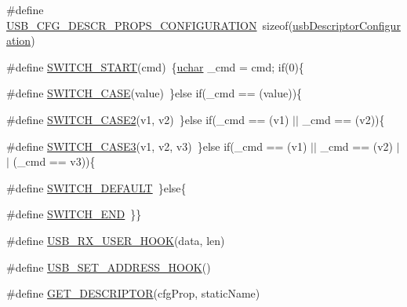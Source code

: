 \begin{DoxyCompactItemize}
\item 
\#define \hyperlink{mhvlib-_vusb-_console_2vusb_2usbdrv_8c_a8aae9f682ca9f91faae0453e4351a50b}{U\-S\-B\-\_\-\-C\-F\-G\-\_\-\-D\-E\-S\-C\-R\-\_\-\-P\-R\-O\-P\-S\-\_\-\-C\-O\-N\-F\-I\-G\-U\-R\-A\-T\-I\-O\-N}~sizeof(\hyperlink{mhvlib-_vusb-_console_2vusb_2usbdrv_8h_a9a566690103d3a34df4893e7c0d3bf10}{usb\-Descriptor\-Configuration})
\item 
\#define \hyperlink{mhvlib-_vusb-_console_2vusb_2usbdrv_8c_ac56b9d981e3fec2bbfb3f15788f6bdb2}{S\-W\-I\-T\-C\-H\-\_\-\-S\-T\-A\-R\-T}(cmd)~\{\hyperlink{mhvlib-_vusb-_console_2vusb_2usbdrv_8h_aa8ddf20cdd716b652e76e23e5e700893}{uchar} \-\_\-cmd = cmd; if(0)\{
\item 
\#define \hyperlink{mhvlib-_vusb-_console_2vusb_2usbdrv_8c_aae1cadf9c1da7851d3bf26f6044c5963}{S\-W\-I\-T\-C\-H\-\_\-\-C\-A\-S\-E}(value)~\}else if(\-\_\-cmd == (value))\{
\item 
\#define \hyperlink{mhvlib-_vusb-_console_2vusb_2usbdrv_8c_aae356661dff6a8095d01d3e75dc3d733}{S\-W\-I\-T\-C\-H\-\_\-\-C\-A\-S\-E2}(v1, v2)~\}else if(\-\_\-cmd == (v1) $|$$|$ \-\_\-cmd == (v2))\{
\item 
\#define \hyperlink{mhvlib-_vusb-_console_2vusb_2usbdrv_8c_a4b5329c382b93afc16758e5d08589574}{S\-W\-I\-T\-C\-H\-\_\-\-C\-A\-S\-E3}(v1, v2, v3)~\}else if(\-\_\-cmd == (v1) $|$$|$ \-\_\-cmd == (v2) $|$$|$ (\-\_\-cmd == v3))\{
\item 
\#define \hyperlink{mhvlib-_vusb-_console_2vusb_2usbdrv_8c_a35f0e4ce76d1d63aeebacb74425798b8}{S\-W\-I\-T\-C\-H\-\_\-\-D\-E\-F\-A\-U\-L\-T}~\}else\{
\item 
\#define \hyperlink{mhvlib-_vusb-_console_2vusb_2usbdrv_8c_a886e28203c262455d99122704a9f0be9}{S\-W\-I\-T\-C\-H\-\_\-\-E\-N\-D}~\}\}
\item 
\#define \hyperlink{mhvlib-_vusb-_console_2vusb_2usbdrv_8c_a95ad02eb72be3e769e4acf0e98ae40bb}{U\-S\-B\-\_\-\-R\-X\-\_\-\-U\-S\-E\-R\-\_\-\-H\-O\-O\-K}(data, len)
\item 
\#define \hyperlink{mhvlib-_vusb-_console_2vusb_2usbdrv_8c_a6a78a51b114a555f4fcc13e78af243b0}{U\-S\-B\-\_\-\-S\-E\-T\-\_\-\-A\-D\-D\-R\-E\-S\-S\-\_\-\-H\-O\-O\-K}()
\item 
\#define \hyperlink{mhvlib-_vusb-_console_2vusb_2usbdrv_8c_a4f20ce9fae0dc2160ae0e8c3d8934f15}{G\-E\-T\-\_\-\-D\-E\-S\-C\-R\-I\-P\-T\-O\-R}(cfg\-Prop, static\-Name)
\end{DoxyCompactItemize}
